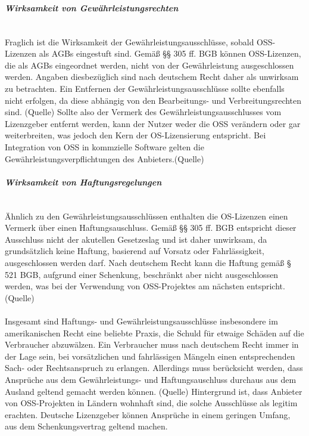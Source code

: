 \subparagraph{Wirksamkeit von Gewährleistungsrechten}$~$

Fraglich ist die Wirksamkeit der Gewährleistungsausschlüsse, sobald OSS-Lizenzen als AGBs eingestuft sind. Gemäß §§ 305 ff. BGB können OSS-Lizenzen, die als AGBs eingeordnet werden, nicht von der Gewährleistung ausgeschlossen werden. Angaben diesbezüglich sind nach deutschem Recht daher als unwirksam zu betrachten. Ein Entfernen der Gewährleistungsausschlüsse sollte ebenfalls nicht erfolgen, da diese abhängig von den Bearbeitungs- und Verbreitungsrechten sind. (Quelle) Sollte also der Vermerk des Gewährleistungsausschlusses vom Lizenzgeber entfernt werden, kann der Nutzer weder die OSS verändern oder gar weiterbreiten, was jedoch den Kern der OS-Lizensierung entspricht. Bei Integration von OSS in kommzielle Software gelten die Gewährleistungsverpflichtungen des Anbieters.(Quelle) 

\subparagraph{Wirksamkeit von Haftungsregelungen}$~$

Ähnlich zu den Gewährleistungsausschlüssen enthalten die OS-Lizenzen einen Vermerk über einen Haftungsauschluss. Gemäß §§ 305 ff. BGB entspricht dieser Ausschluss nicht der akutellen Gesetzeslag und ist daher unwirksam, da grundsätzlich keine Haftung, basierend auf Vorsatz oder Fahrlässigkeit, ausgeschlossen werden darf. Nach deutschem Recht kann die Haftung gemäß § 521 BGB, aufgrund einer Schenkung, beschränkt aber nicht ausgeschlossen werden, was bei der Verwendung von OSS-Projektes am nächsten entspricht. (Quelle) \\\\

Insgesamt sind Haftungs- und Gewährleistungsausschlüsse insbesondere im amerikanischen Recht eine beliebte Praxis, die Schuld für etwaige Schäden auf die Verbraucher abzuwälzen. Ein Verbraucher muss nach deutschem Recht immer in der Lage sein, bei vorsätzlichen und fahrlässigen Mängeln einen entsprechenden Sach- oder Rechtsanspruch zu erlangen. Allerdings muss berücksicht werden, dass Ansprüche aus dem Gewährleistungs- und Haftungsauschluss durchaus aus dem Ausland geltend gemacht werden können. (Quelle) Hintergrund ist, dass Anbieter von OSS-Projekten in Ländern wohnhaft sind, die solche Ausschlüsse als legitim erachten. Deutsche Lizenzgeber können Ansprüche in einem geringen Umfang, aus dem Schenkungsvertrag geltend machen. 

